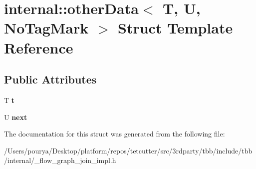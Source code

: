 \hypertarget{structinternal_1_1otherData}{}\section{internal\+:\+:other\+Data$<$ T, U, No\+Tag\+Mark $>$ Struct Template Reference}
\label{structinternal_1_1otherData}
\subsection*{Public Attributes}
\begin{DoxyCompactItemize}
\item 
\hypertarget{structinternal_1_1otherData_ac4793aff17b43b2ffcbdb71732c9ef87}{}T {\bfseries t}\label{structinternal_1_1otherData_ac4793aff17b43b2ffcbdb71732c9ef87}

\item 
\hypertarget{structinternal_1_1otherData_a91bd6f22c3447a992c1c226180298a97}{}U {\bfseries next}\label{structinternal_1_1otherData_a91bd6f22c3447a992c1c226180298a97}

\end{DoxyCompactItemize}


The documentation for this struct was generated from the following file\+:\begin{DoxyCompactItemize}
\item 
/\+Users/pourya/\+Desktop/platform/repos/tetcutter/src/3rdparty/tbb/include/tbb/internal/\+\_\+flow\+\_\+graph\+\_\+join\+\_\+impl.\+h\end{DoxyCompactItemize}
